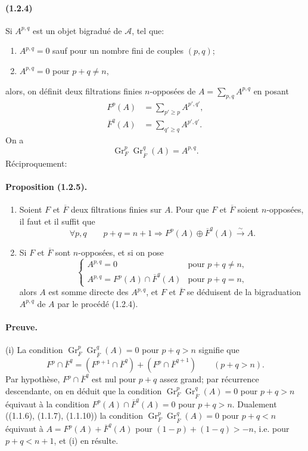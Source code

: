 \documentclass[10pt]{article}
\newcommand{\Gr}{\operatorname{Gr}}
\newcommand{\calA}{\mathcal A}
\newcommand{\iso}{\xrightarrow{\sim}}
\begin{document}
\paragraph{(1.2.4)} Si $A^{p,q}$ est un objet bigradué de $\calA$, tel que:
\begin{enumerate}[label=\alph*)]
\item $A^{p,q}=0$ sauf pour un nombre fini de couples $(p,q)$;
\item $A^{p,q}=0$ pour $p+q\ne n$,
\end{enumerate}
alors, on définit deux filtrations finies $n$-opposées de $A=\sum_{p,q}A^{p,q}$ en posant
\begin{align}
F^p(A)&=\sum_{p'\ge p} A^{p',q'}, \tag{1.2.4.1}\\
\overline F^q(A)&=\sum_{q'\ge q} A^{p',q'}. \tag{1.2.4.2}
\end{align}
On a
\[
\tag{1.2.4.3}
\Gr_F^p\Gr_{\overline F}^{q}(A)=A^{p,q}.
\]
Réciproquement:

\paragraph{Proposition (1.2.5).} \begin{enumerate}[label=(\roman*)]
\item Soient $F$ et $\overline F$ deux filtrations finies sur $A$. Pour que $F$ et $\overline F$ soient $n$-opposées, il faut et il suffit que
\[
\forall p,q\qquad p+q=n+1\Rightarrow F^p(A)\oplus\overline F^q(A)\iso A.
\]
\item Si $F$ et $\overline F$ sont $n$-opposées, et si on pose
\[
\begin{cases}
A^{p,q}=0 & \text{pour }p+q\ne n,\\
A^{p,q}=F^p(A)\cap\overline F^q(A) & \text{pour }p+q=n,
\end{cases}
\]
alors $A$ est somme directe des $A^{p,q}$, et $F$ et $\overline F$ se déduisent de la bigraduation $A^{p,q}$ de $A$ par le procédé (1.2.4).
\end{enumerate}

\paragraph{Preuve.} (i) La condition $\Gr_F^p\Gr_{\overline F}^q(A)=0$ pour $p+q>n$ signifie que
\[
F^p\cap\overline F^q=(F^{p+1}\cap\overline F^q)+(F^p\cap\overline F^{q+1})\qquad(p+q>n).
\]
Par hypothèse, $F^p\cap\overline F^q$ est nul pour $p+q$ assez grand; par récurrence descendante, on en déduit que la condition $\Gr_F^p\Gr_{\overline F}^q(A)=0$ pour $p+q>n$ équivaut à la condition $F^p(A)\cap\overline F^q(A)=0$ pour $p+q>n$. Dualement ((1.1.6), (1.1.7), (1.1.10)) la condition $\Gr_F^p\Gr_{\overline F}^q(A)=0$ pour $p+q<n$ équivaut à $A=F^p(A)+\overline F^q(A)$ pour $(1-p)+(1-q)>-n$, i.e. pour $p+q<n+1$, et (i) en résulte.
\end{document}
